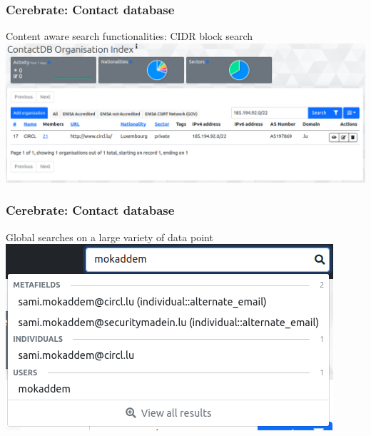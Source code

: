 \begin{frame}
    \frametitle{Cerebrate: Contact database}
    Content aware search functionalities: CIDR block search
    \includegraphics[width=0.99\linewidth]{pictures/cerebrate2.png}
\end{frame}

\begin{frame}
    \frametitle{Cerebrate: Contact database}
    Global searches on a large variety of data point
    \includegraphics[width=0.99\linewidth]{pictures/cerebrate3.png}
\end{frame}

